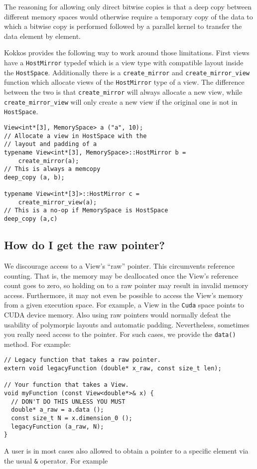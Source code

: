 The reasoning for allowing only direct bitwise copies is that a deep copy
between different memory spaces would otherwise require a temporary 
copy of the data to which a bitwise copy is performed followed by a parallel
kernel to transfer the data element by element. 

Kokkos provides the following way to work around those limitations. 
First views have a \lstinline|HostMirror| typedef which is a view type with 
compatible layout inside the \lstinline|HostSpace|. Additionally there is a
\lstinline|create_mirror| and \lstinline|create_mirror_view| function which 
allocate views of the \lstinline|HostMirror| type of a view. 
The difference between the two is that \lstinline|create_mirror| will always
allocate a new view, while \lstinline|create_mirror_view| will only create a 
new view if the original one is not in \lstinline|HostSpace|.

\begin{lstlisting}
View<int*[3], MemorySpace> a ("a", 10);
// Allocate a view in HostSpace with the 
// layout and padding of a
typename View<int*[3], MemorySpace>::HostMirror b =
    create_mirror(a);
// This is always a memcopy
deep_copy (a, b); 

typename View<int*[3]>::HostMirror c =
    create_mirror_view(a);
// This is a no-op if MemorySpace is HostSpace
deep_copy (a,c)
\end{lstlisting}


\subsection{How do I get the raw pointer?}

We discourage access to a View's ``raw'' pointer.  This circumvents
reference counting.  That is, the memory may be deallocated once the
View's reference count goes to zero, so holding on to a raw pointer
may result in invalid memory access.  Furthermore, it may not even be
possible to access the View's memory from a given execution space.
For example, a View in the \lstinline!Cuda! space points to CUDA device
memory. Also using raw pointers would normally defeat the usability 
of polymorpic layouts and automatic padding. 
Nevertheless, sometimes you really need access to the
pointer.  For such cases, we provide the \lstinline!data()!
method.  For example:
\begin{lstlisting}
// Legacy function that takes a raw pointer.
extern void legacyFunction (double* x_raw, const size_t len);

// Your function that takes a View.
void myFunction (const View<double*>& x) {
  // DON'T DO THIS UNLESS YOU MUST
  double* a_raw = a.data ();
  const size_t N = x.dimension_0 ();
  legacyFunction (a_raw, N);
}
\end{lstlisting}
A user is in most cases also allowed to obtain a pointer to a specific 
element via the usual \lstinline|&| operator. For example

